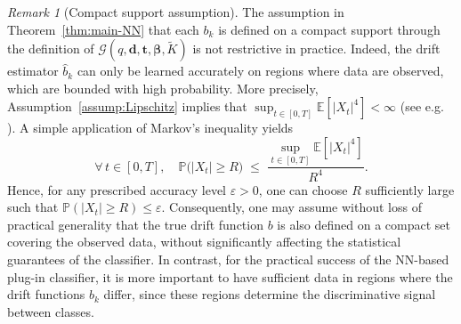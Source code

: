 \documentclass{article}
\theoremstyle{plain}
\theoremstyle{definition}
\theoremstyle{remark}
\newtheorem{remark}[theorem]{Remark}
\newcommand{\PP}{\mathbb{P}}
\newcommand{\EE}{\mathbb{E}}
\newcommand{\rr}{\color{red}}
\newcommand{\black}{\color{black}}
\begin{document}
\begin{remark}[Compact support assumption]
The assumption in Theorem~\ref{thm:main-NN} that each $b_k$ is defined on a compact support through the definition of
$\mathcal{G}(q,\mathbf{d},\mathbf{t},\boldsymbol{\beta},\widetilde K)$ is not restrictive in practice.
Indeed, the drift estimator $\widehat b_k$ can only be learned accurately on regions where data are observed, which are bounded with high probability. More precisely, Assumption~\ref{assump:Lipschitz} implies that
$\sup_{t \in [0,T]} \EE[|X_t|^4] < \infty$ (see e.g. \citet[Proposition 7.2]{pages2018numerical}).
A simple application of Markov's inequality yields
\[ \forall \, t\in [0,T], \quad 
\PP\big(|X_t| \ge R\big)
\;\le\;
\frac{\sup_{t\in[0,T]}\EE[|X_t|^4]}{R^4}.
\]
Hence, for any prescribed accuracy level $\varepsilon > 0$, one can choose $R$ sufficiently large such that
$\PP(|X_t| \ge R) \le \varepsilon$.
Consequently, one may assume without loss of practical generality that the true drift function $b$ is also defined
on a compact set covering the observed data, without significantly affecting the statistical guarantees of the classifier.
In contrast, for the practical success of the NN-based plug-in classifier, it is more important to have sufficient data in regions where the drift functions $b_k$ differ, since these regions determine the discriminative signal between classes.  %
\end{remark}







\end{document}
